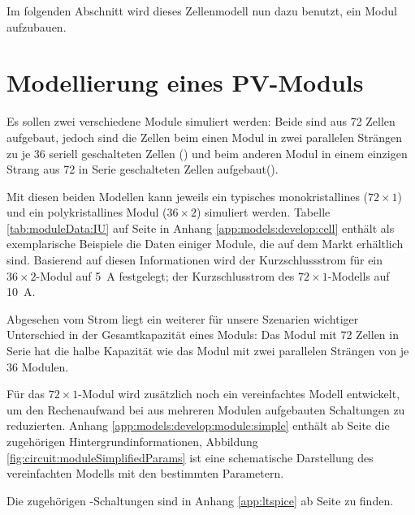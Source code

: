 Im folgenden Abschnitt wird dieses Zellenmodell nun dazu benutzt, ein Modul
aufzubauen.


\clearpage
\section{Modellierung eines PV-Moduls}
\label{sec:simu:model:module}

Es  sollen   zwei  verschiedene   Module  simuliert  werden: Beide   sind  aus
72   Zellen   aufgebaut,   jedoch   sind   die   Zellen   beim   einen   Modul
in   zwei    parallelen   Str\"angen    zu   je   36    seriell   geschalteten
Zellen   ()    und   beim    anderen   Modul
in   einem   einzigen   Strang   aus   72   in   Serie   geschalteten   Zellen
aufgebaut().

Mit  diesen  beiden  Modellen  kann  jeweils  ein  typisches  monokristallines
($72  \times 1$)  und ein  polykristallines  Modul ($36  \times 2$)  simuliert
werden. Tabelle \ref{tab:moduleData:IU}  auf Seite \pageref{tab:moduleData:IU}
in Anhang \ref{app:models:develop:cell}  enth\"alt als exemplarische Beispiele
die Daten einiger  Module, die auf dem Markt  erh\"altlich sind. Basierend auf
diesen Informationen wird  der Kurzschlussstrom f\"ur ein  $36 \times 2$-Modul
auf \SI{5}{\ampere} festgelegt; der  Kurzschlusstrom des $72 \times 1$-Modells
auf \SI{10}{\ampere}.

Abgesehen  vom  Strom liegt  ein  weiterer  f\"ur unsere  Szenarien  wichtiger
Unterschied in der Gesamtkapazit\"at eines  Moduls: Das Modul mit 72 Zellen in
Serie hat die  halbe Kapazit\"at wie das Modul mit  zwei parallelen Str\"angen
von je 36 Modulen.

F\"ur     das    $72     \times     1$-Modul     wird    zus\"atzlich     noch
ein     vereinfachtes    Modell     entwickelt,    um     den    Rechenaufwand
bei      aus     mehreren      Modulen     aufgebauten      Schaltungen     zu
reduzierten. Anhang   \ref{app:models:develop:module:simple}    enth\"alt   ab
Seite     \pageref{app:models:develop:module:simple}     die     zugeh\"origen
Hintergrundinformationen,  Abbildung  \ref{fig:circuit:moduleSimplifiedParams}
ist eine schematische Darstellung des vereinfachten Modells mit den bestimmten
Parametern.

Die zugeh\"origen -Schaltungen  sind in Anhang \ref{app:ltspice}
ab Seite \pageref{app:ltspice} zu finden.

